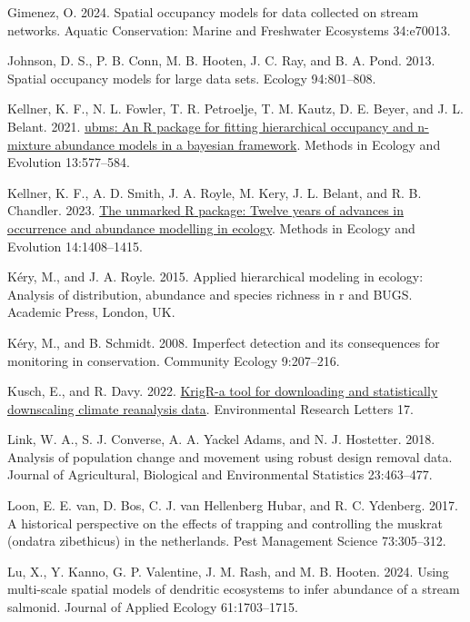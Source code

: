 \documentclass[
  11pt,
  a4paper,
]{article}
\newlength{\cslhangindent}
\newenvironment{CSLReferences}[2] %
 {\begin{list}{}{%
  \setlength{\itemindent}{0pt}
  \setlength{\leftmargin}{0pt}
  \setlength{\parsep}{0pt}
  \ifodd #1
   \setlength{\leftmargin}{\cslhangindent}
   \setlength{\itemindent}{-1\cslhangindent}
  \fi
  \setlength{\itemsep}{#2\baselineskip}}}
 {\end{list}}
\begin{document}
\begin{CSLReferences}{1}{0}
Gimenez, O. 2024. Spatial occupancy models for data collected on stream networks. Aquatic Conservation: Marine and Freshwater Ecosystems 34:e70013.

Johnson, D. S., P. B. Conn, M. B. Hooten, J. C. Ray, and B. A. Pond. 2013. Spatial occupancy models for large data sets. Ecology 94:801--808.

Kellner, K. F., N. L. Fowler, T. R. Petroelje, T. M. Kautz, D. E. Beyer, and J. L. Belant. 2021. \href{https://doi.org/10.1111/2041-210X.13777}{{ubms}: An {R} package for fitting hierarchical occupancy and n-mixture abundance models in a bayesian framework}. Methods in Ecology and Evolution 13:577--584.

Kellner, K. F., A. D. Smith, J. A. Royle, M. Kery, J. L. Belant, and R. B. Chandler. 2023. \href{https://www.jstatsoft.org/v43/i10/}{The {unmarked} {R} package: Twelve years of advances in occurrence and abundance modelling in ecology}. Methods in Ecology and Evolution 14:1408--1415.

Kéry, M., and J. A. Royle. 2015. Applied hierarchical modeling in ecology: Analysis of distribution, abundance and species richness in r and BUGS. Academic Press, London, UK.

Kéry, M., and B. Schmidt. 2008. Imperfect detection and its consequences for monitoring in conservation. Community Ecology 9:207--216.

Kusch, E., and R. Davy. 2022. \href{https://doi.org/10.1088/1748-9326/ac48b3}{KrigR-a tool for downloading and statistically downscaling climate reanalysis data}. Environmental Research Letters 17.

Link, W. A., S. J. Converse, A. A. Yackel Adams, and N. J. Hostetter. 2018. Analysis of population change and movement using robust design removal data. Journal of Agricultural, Biological and Environmental Statistics 23:463--477.

Loon, E. E. van, D. Bos, C. J. van Hellenberg Hubar, and R. C. Ydenberg. 2017. A historical perspective on the effects of trapping and controlling the muskrat (ondatra zibethicus) in the netherlands. Pest Management Science 73:305--312.

Lu, X., Y. Kanno, G. P. Valentine, J. M. Rash, and M. B. Hooten. 2024. Using multi-scale spatial models of dendritic ecosystems to infer abundance of a stream salmonid. Journal of Applied Ecology 61:1703--1715.


\end{CSLReferences}
\end{document}
